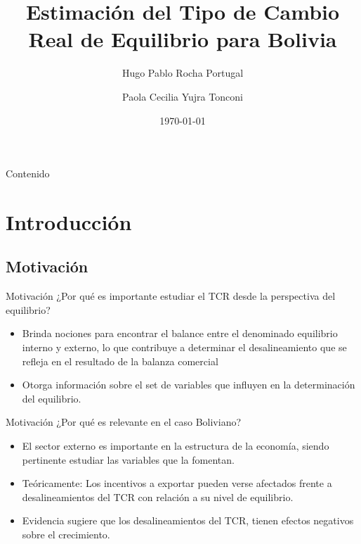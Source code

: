 \documentclass{beamer}
\title{Estimación del Tipo de Cambio Real de Equilibrio para Bolivia}
\author{Hugo Pablo Rocha Portugal \and Paola Cecilia Yujra Tonconi}
\date{\today}
\begin{document}
\begin{frame}
\titlepage
\end{frame}

\begin{frame}{Contenido}
\begin{multicols}{2}
\tableofcontents
\end{multicols}
\end{frame}

\section[Introducción]{Introducción}
\subsection[Motivación]{Motivación}
\begin{frame}{Motivación}
¿Por qué es importante estudiar el TCR desde la perspectiva del equilibrio?
\begin{itemize}
\item Brinda nociones para encontrar el balance entre el denominado equilibrio interno y externo, lo que contribuye a determinar el desalineamiento que se refleja en el resultado de la balanza comercial   
\item Otorga información sobre el set de variables que influyen en la determinación del equilibrio.
\end{itemize}
\end{frame}

\begin{frame}{Motivación}
¿Por qué es relevante en el caso Boliviano?
\begin{itemize}
\item El sector externo es importante en la estructura de la economía, siendo pertinente estudiar las variables que la fomentan.
\item Teóricamente: Los incentivos a exportar pueden verse afectados frente a desalineamientos del TCR con relación a su nivel de equilibrio. 
\item Evidencia sugiere que los desalineamientos del TCR, tienen efectos negativos sobre el crecimiento.   
\end{itemize}
\end{frame}
\end{document}
